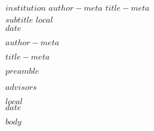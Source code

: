 \documentclass[12pt]{article}
\begin{document}

\begin{titlepage}
\begin{center}
\textbf{\uppercase{$institution$}}
\vfill       
\textbf{\uppercase{$author-meta$}}     
\vfill
\textbf{\uppercase{$title-meta$}}\\
\textbf{\uppercase{$subtitle$}}
\vfill   
\textbf{\uppercase{$local$}}\\
\textbf{\uppercase{$date$}}     
\end{center}
\end{titlepage}


\thispagestyle{empty}

\begin{center}
\textbf{\uppercase{$author-meta$}}

\vfill

\textbf{\uppercase{$title-meta$}}
\end{center}

\vfill

\hspace{.45\textwidth}
\begin{minipage}{.5\textwidth}
\begin{singlespace}
$preamble$
\end{singlespace}
\end{minipage}

\vfill

\hspace{.45\textwidth}
\begin{minipage}{.5\textwidth}
$advisors$
\end{minipage}

\vfill

\begin{center}  
\textbf{\uppercase{$local$}}\\
\textbf{\uppercase{$date$}}     
\end{center}
\pagebreak


$body$
\end{document}
